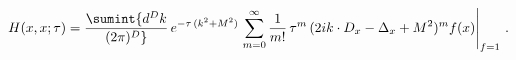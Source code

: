 \begin{equation}
  \label{eq:expanhs}
H(x,x;\tau) = \sumint {d^{D}k \over (2 \pi)^{D}} \, e^{-\tau \, (k^2+M^2)}
\left. 
\sum\limits_{m=0}^\infty {1 \over m!} \, \tau^m \, (2 i k \cdot D_x - \Delta_x + M^2)^m
f(x) \right\vert_{f = 1}  \,.
\end{equation}

